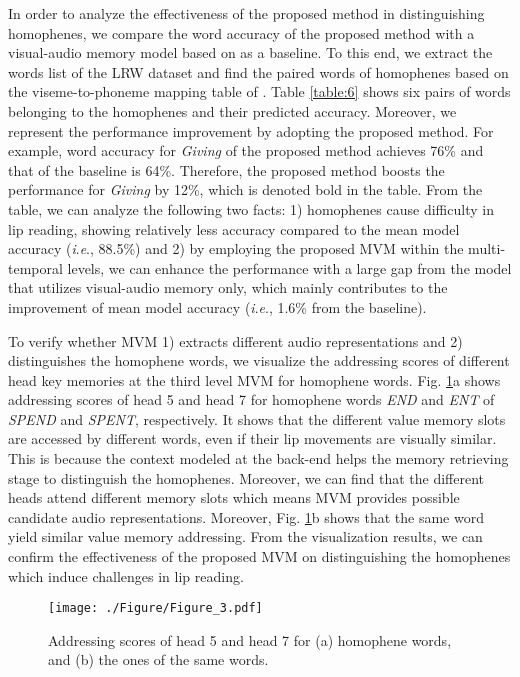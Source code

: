 \documentclass[letterpaper]{article} \usepackage{aaai22}  \usepackage{times}  \usepackage{helvet}  \usepackage{courier}  \usepackage[hyphens]{url}  \usepackage{graphicx} \urlstyle{rm} \def\UrlFont{\rm}  \usepackage{natbib}  \usepackage{caption} \DeclareCaptionStyle{ruled}{labelfont=normalfont,labelsep=colon,strut=off} \frenchspacing  \setlength{\pdfpagewidth}{8.5in}  \setlength{\pdfpageheight}{11in}  \usepackage{algorithm}
\newcommand{\ie}{\textit{i}.\textit{e}.}
\begin{document}
In order to analyze the effectiveness of the proposed method in distinguishing homophenes, we compare the word accuracy of the proposed method with a visual-audio memory model based on \cite{kim2021visualaudiomem} as a baseline. To this end, we extract the words list of the LRW dataset and find the paired words of homophenes based on the viseme-to-phoneme mapping table of \cite{cappelletta2012phonemetoviseme}. Table \ref{table:6} shows six pairs of words belonging to the homophenes and their predicted accuracy. Moreover, we represent the performance improvement by adopting the proposed method. For example, word accuracy for \textit{Giving} of the proposed method achieves 76\% and that of the baseline is 64\%. Therefore, the proposed method boosts the performance for \textit{Giving} by 12\%, which is denoted bold in the table. From the table, we can analyze the following two facts: 1) homophenes cause difficulty in lip reading, showing relatively less accuracy compared to the mean model accuracy (\ie, 88.5\%) and 2) by employing the proposed MVM within the multi-temporal levels, we can enhance the performance with a large gap from the model that utilizes visual-audio memory only, which mainly contributes to the improvement of mean model accuracy (\ie, 1.6\% from the baseline).

To verify whether MVM 1) extracts different audio representations and 2) distinguishes the homophene words, we visualize the addressing scores of different head key memories at the third level MVM for homophene words. Fig. \ref{fig:3}a shows addressing scores of head 5 and head 7 for homophene words \textit{END} and \textit{ENT} of \textit{SPEND} and \textit{SPENT}, respectively. It shows that the different value memory slots are accessed by different words, even if their lip movements are visually similar. This is because the context modeled at the back-end helps the memory retrieving stage to distinguish the homophenes. Moreover, we can find that the different heads attend different memory slots which means MVM provides possible candidate audio representations. Moreover, Fig. \ref{fig:3}b shows that the same word yield similar value memory addressing. From the visualization results, we can confirm the effectiveness of the proposed MVM on distinguishing the homophenes which induce challenges in lip reading.

\begin{figure}[t!]
	\begin{minipage}[b]{1.0\linewidth}
		\centering
		\centerline{\texttt{[image: ./Figure/Figure\_3.pdf]}}
	\end{minipage}
	\caption{Addressing scores of head 5 and head 7 for (a) homophene words, and (b) the ones of the same words.}
	\label{fig:3}
\end{figure}
\end{document}
